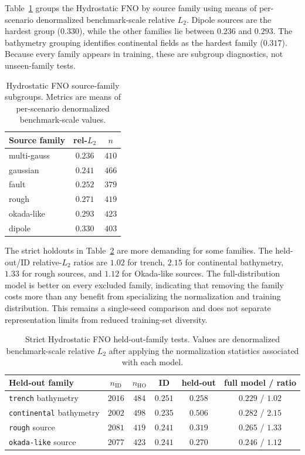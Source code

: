 Table~\ref{tab:ood} groups the Hydrostatic FNO by source family using means of per-scenario denormalized benchmark-scale relative $L_2$. Dipole sources are the hardest group ($0.330$), while the other families lie between $0.236$ and $0.293$. The bathymetry grouping identifies continental fields as the hardest family ($0.317$). Because every family appears in training, these are subgroup diagnostics, not unseen-family tests.

\begin{table}[pos=!htbp]
\centering
\caption{Hydrostatic FNO source-family subgroups. Metrics are means of per-scenario denormalized benchmark-scale values.}
\label{tab:ood}
\begin{tabular}{lcc}
    \toprule
    Source family & rel-$L_2$ & $n$ \\
    \midrule
    multi-gauss & $0.236$ & $410$ \\
    gaussian    & $0.241$ & $466$ \\
    fault       & $0.252$ & $379$ \\
    rough       & $0.271$ & $419$ \\
    okada-like  & $0.293$ & $423$ \\
    dipole      & $\mathbf{0.330}$ & $403$ \\
    \bottomrule
\end{tabular}
\end{table}

The strict holdouts in Table~\ref{tab:strict-holdout} are more demanding for some families. The held-out/ID relative-$L_2$ ratios are $1.02$ for trench, $2.15$ for continental bathymetry, $1.33$ for rough sources, and $1.12$ for Okada-like sources. The full-distribution model is better on every excluded family, indicating that removing the family costs more than any benefit from specializing the normalization and training distribution. This remains a single-seed comparison and does not separate representation limits from reduced training-set diversity.

\begin{table}[pos=!htbp]
\centering
    \caption{Strict Hydrostatic FNO held-out-family tests. Values are denormalized benchmark-scale relative $L_2$ after applying the normalization statistics associated with each model.}
\label{tab:strict-holdout}
\begin{tabular}{lccccc}
    \toprule
    Held-out family & $n_{\mathrm{ID}}$ & $n_{\mathrm{HO}}$ & ID & held-out & full model / ratio \\
    \midrule
    \texttt{trench} bathymetry      & $2016$ & $484$ & $0.251$ & $0.258$ & $0.229$ / $1.02$ \\
    \texttt{continental} bathymetry & $2002$ & $498$ & $0.235$ & $0.506$ & $0.282$ / $2.15$ \\
    \texttt{rough} source           & $2081$ & $419$ & $0.241$ & $0.319$ & $0.265$ / $1.33$ \\
    \texttt{okada-like} source      & $2077$ & $423$ & $0.241$ & $0.270$ & $0.246$ / $1.12$ \\
    \bottomrule
\end{tabular}
\end{table}

